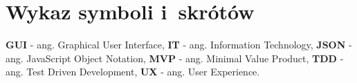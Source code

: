\chapter*{Wykaz symboli i~skrótów}

\noindent
\textbf{GUI} - ang. Graphical User Interface, \newline
\textbf{IT} - ang. Information Technology, \newline
\textbf{JSON} - ang. JavaScript Object Notation, \newline
\textbf{MVP} - ang. Minimal Value Product, \newline
\textbf{TDD} - ang. Test Driven Development, \newline
\textbf{UX} - ang. User Experience. \newline

\cleardoublepage